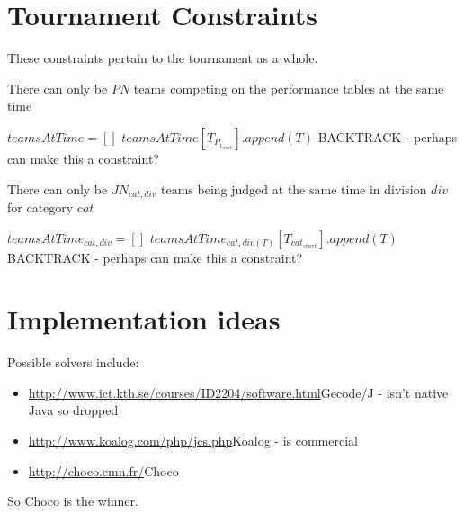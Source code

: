 \documentclass[letterpaper,11pt]{report}
\begin{document}
\section{Tournament Constraints}
These constraints pertain to the tournament as a whole.

\begin{algorithm}
\caption{There can only be $PN$ teams competing on the performance tables
at the same time}
\begin{algorithmic}

\STATE $teamsAtTime = []$
    \STATE $teamsAtTime[T_{P_{i_{start}}}].append(T)$
  \ENDFOR
      \STATE BACKTRACK - perhaps can make this a constraint?
    \ENDIF
  \ENDFOR
\ENDFOR

\end{algorithmic}
\end{algorithm}

\begin{algorithm}
\caption{There can only be $JN_{cat,div}$ teams being judged at the same
time in division $div$ for category $cat$}
\begin{algorithmic}
    \STATE $teamsAtTime_{cat,div} = []$
  \ENDFOR
    \STATE $teamsAtTime_{cat,div(T)}[T_{cat_{start}}].append(T)$
  \ENDFOR
        \STATE BACKTRACK - perhaps can make this a constraint?
      \ENDIF
    \ENDFOR
  \ENDFOR
\ENDFOR
\end{algorithmic}
\end{algorithm}

\section{Implementation ideas}
Possible solvers include:
\begin{itemize}
\item \url{http://www.ict.kth.se/courses/ID2204/software.html}{Gecode/J} - isn't native Java so dropped
\item \url{http://www.koalog.com/php/jcs.php}{Koalog} - is commercial
\item \url{http://choco.emn.fr/}{Choco}
\end{itemize}

So Choco is the winner.
\end{document}
